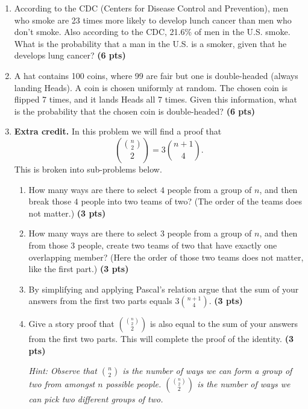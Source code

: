 \documentclass[11pt]{article}
\begin{document}
\begin{enumerate}
\item According to the CDC (Centers for Disease Control and Prevention),
men who smoke are 23 times more likely to develop lunch cancer than men
who don't smoke.  Also according to the CDC, 21.6\% of men in the U.S. smoke.
What is the probability that a man in the U.S. is a smoker, given that he
develops lung cancer? \textbf{(6 pts)}

\item A hat contains 100 coins, where 99 are fair but one is double-headed
(always landing Heads).  A coin is chosen uniformly at random.  The chosen coin
is flipped 7 times, and it lands Heads all 7 times.  Given this information,
what is the probability that the chosen coin is double-headed? \textbf{(6 pts)}



\item \textbf{Extra credit.} In this problem we will find a proof that
\[
\binom{\binom{n}{2}}{2} = 3\binom{n+1}{4}.
\]
This is broken into sub-problems below.
\begin{enumerate}

\item  How many ways are there to select $4$ people from
a group of $n$, and then break those $4$ people into
two teams of two?  (The order of the teams does not matter.) \textbf{(3 pts)}

\item How many ways are there to select $3$ people from a group of
$n$, and then from those $3$ people, create two teams of two that have exactly
one
overlapping member?  (Here the order of those two teams does not matter, like
the first part.) \textbf{(3 pts)}

\item By simplifying and applying Pascal's relation argue that the
sum of your answers from the first two parts equals $3\binom{n+1}{4}$.
\textbf{(3 pts)}

\item Give a story proof that $\binom{\binom{n}{2}}{2}$ is also
equal to the sum of your answers from the first two parts.  This will complete
the proof of the identity.
\textbf{(3 pts)}

\emph{Hint:  Observe that $\binom{n}{2}$ is the number of ways we can form a
group of two from amongst $n$ possible people.  $\binom{\binom{n}{2}}{2}$ is
the number of ways we can pick two different groups of two.}

\end{enumerate}



\end{enumerate}
\end{document}
